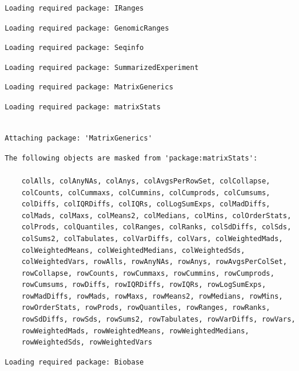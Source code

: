 \documentclass[
  letterpaper,
  DIV=11,
  numbers=noendperiod]{scrartcl}
\begin{document}
\begin{verbatim}
Loading required package: IRanges
\end{verbatim}

\begin{verbatim}
Loading required package: GenomicRanges
\end{verbatim}

\begin{verbatim}
Loading required package: Seqinfo
\end{verbatim}

\begin{verbatim}
Loading required package: SummarizedExperiment
\end{verbatim}

\begin{verbatim}
Loading required package: MatrixGenerics
\end{verbatim}

\begin{verbatim}
Loading required package: matrixStats
\end{verbatim}

\begin{verbatim}

Attaching package: 'MatrixGenerics'
\end{verbatim}

\begin{verbatim}
The following objects are masked from 'package:matrixStats':

    colAlls, colAnyNAs, colAnys, colAvgsPerRowSet, colCollapse,
    colCounts, colCummaxs, colCummins, colCumprods, colCumsums,
    colDiffs, colIQRDiffs, colIQRs, colLogSumExps, colMadDiffs,
    colMads, colMaxs, colMeans2, colMedians, colMins, colOrderStats,
    colProds, colQuantiles, colRanges, colRanks, colSdDiffs, colSds,
    colSums2, colTabulates, colVarDiffs, colVars, colWeightedMads,
    colWeightedMeans, colWeightedMedians, colWeightedSds,
    colWeightedVars, rowAlls, rowAnyNAs, rowAnys, rowAvgsPerColSet,
    rowCollapse, rowCounts, rowCummaxs, rowCummins, rowCumprods,
    rowCumsums, rowDiffs, rowIQRDiffs, rowIQRs, rowLogSumExps,
    rowMadDiffs, rowMads, rowMaxs, rowMeans2, rowMedians, rowMins,
    rowOrderStats, rowProds, rowQuantiles, rowRanges, rowRanks,
    rowSdDiffs, rowSds, rowSums2, rowTabulates, rowVarDiffs, rowVars,
    rowWeightedMads, rowWeightedMeans, rowWeightedMedians,
    rowWeightedSds, rowWeightedVars
\end{verbatim}

\begin{verbatim}
Loading required package: Biobase
\end{verbatim}
\end{document}
